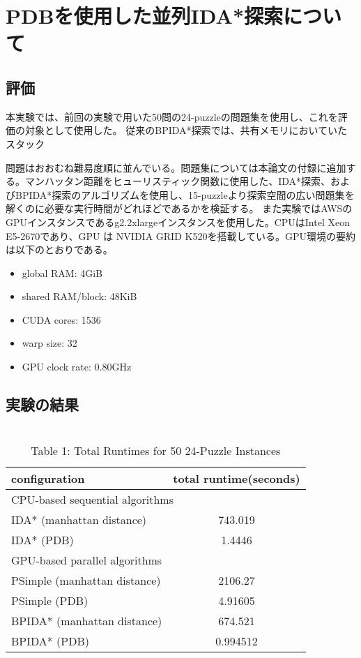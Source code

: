 \documentclass[a4paper,11pt,oneside,openany]{jsbook}
\begin{document}
\section{PDBを使用した並列IDA*探索について}
\subsection{評価}
本実験では、前回の実験で用いた50問の24-puzzleの問題集を使用し、これを評価の対象として使用した。
従来のBPIDA*探索では、共有メモリにおいていたスタック

問題はおおむね難易度順に並んでいる。問題集については本論文の付録に追加する。マンハッタン距離をヒューリスティック関数に使用した、IDA*探索、およびBPIDA*探索\cite{HA17}のアルゴリズムを使用し、15-puzzleより探索空間の広い問題集を解くのに必要な実行時間がどれほどであるかを検証する。
また実験ではAWSのGPUインスタンスであるg2.2xlargeインスタンスを使用した。CPUはIntel Xeon E5-2670であり、GPU
は NVIDIA GRID K520を搭載している。GPU環境の要約は以下のとおりである。
\begin{itemize}
 \item global RAM: 4GiB
 \item shared RAM/block: 48KiB
 \item CUDA cores: 1536
 \item warp size: 32
 \item GPU clock rate: 0.80GHz
\end{itemize}

\subsection{実験の結果}

\section{}









\begin{table}[]
\centering
\caption{Table 1: Total Runtimes for 50 24-Puzzle Instances}
\label{my-label}
\begin{tabular}{|l|c|}
\hline
configuration & \multicolumn{1}{l|}{total runtime(seconds)} \\ \hline
\multicolumn{2}{|l|}{CPU-based sequential algorithms} \\ \hline
IDA* (manhattan distance) & 743.019 \\
IDA* (PDB) & 1.4446 \\ \hline
\multicolumn{2}{|l|}{GPU-based parallel algorithms} \\ \hline
PSimple (manhattan distance) & 2106.27 \\
PSimple (PDB) & 4.91605 \\
BPIDA* (manhattan distance) & 674.521 \\
BPIDA* (PDB) & 0.994512 \\ \hline
\end{tabular}
\end{table}
\end{document}
